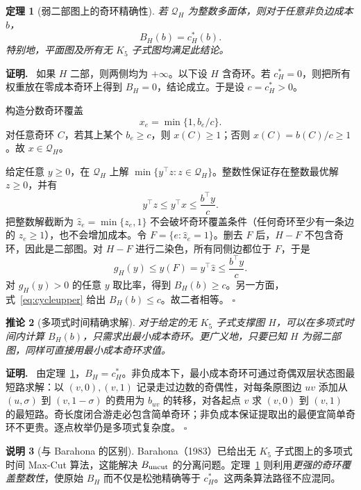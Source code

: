\documentclass[11pt,a4paper]{ctexart}
\newtheorem{theorem}{定理}[section]
\newtheorem{corollary}[theorem]{推论}
\theoremstyle{definition}
\newtheorem{remark}[theorem]{说明}
\newenvironment{proofcn}{\par\noindent\textbf{证明.}\ }{\hfill$\square$\par}
\newcommand{\1}{\boldsymbol 1}
\begin{document}
\begin{theorem}[弱二部图上的奇环精确性]\label{thm:weak}
若 $\mathcal Q_H$ 为整数多面体，则对于任意非负边成本 $b$，
\begin{equation}\label{eq:weakeq}
 \boxed{B_H(b)=c_H^*(b).}
\end{equation}
特别地，平面图及所有无 $K_5$ 子式图均满足此结论。
\end{theorem}
\begin{proofcn}
如果 $H$ 二部，则两侧均为 $+\infty$。以下设 $H$ 含奇环。若 $c_H^*=0$，则把所有权重放在零成本奇环上得到 $B_H=0$，结论成立。于是设 $c=c_H^*>0$。

构造分数奇环覆盖
\[
 x_e=\min\{1,b_e/c\}.
\]
对任意奇环 $C$，若其上某个 $b_e\ge c$，则 $x(C)\ge1$；否则 $x(C)=b(C)/c\ge1$。故 $x\in\mathcal Q_H$。

给定任意 $y\ge0$，在 $\mathcal Q_H$ 上解 $\min\{y^\top z:z\in\mathcal Q_H\}$。整数性保证存在整数最优解 $z\ge0$，并有
\[
 y^\top z\le y^\top x\le\frac{b^\top y}{c}.
\]
把整数解截断为 $\widehat z_e=\min\{z_e,1\}$ 不会破坏奇环覆盖条件（任何奇环至少有一条边的 $z_e\ge1$），也不会增加成本。令 $F=\{e:\widehat z_e=1\}$。删去 $F$ 后，$H-F$ 不包含奇环，因此是二部图。对 $H-F$ 进行二染色，所有同侧边都位于 $F$，于是
\[
 g_H(y)\le y(F)=y^\top\widehat z
 \le\frac{b^\top y}{c}.
\]
对 $g_H(y)>0$ 的任意 $y$ 取比率，得到 $B_H(b)\ge c$。另一方面，式~\eqref{eq:cycleupper} 给出 $B_H(b)\le c$。故二者相等。
\end{proofcn}

\begin{corollary}[多项式时间精确求解]\label{cor:minor}
对于给定的无 $K_5$ 子式支撑图 $H$，可以在多项式时间内计算 $B_H(b)$，只需求出最小成本奇环。更广义地，只要已知 $H$ 为弱二部图，同样可直接用最小成本奇环求值。
\end{corollary}
\begin{proofcn}
由定理~\ref{thm:weak}，$B_H=c_H^*$。非负成本下，最小成本奇环可通过奇偶双层状态图最短路求解：以 $(v,0),(v,1)$ 记录走过边数的奇偶性，对每条原图边 $uv$ 添加从 $(u,\sigma)$ 到 $(v,1-\sigma)$ 的费用为 $b_{uv}$ 的转移，对各起点 $v$ 求 $(v,0)$ 到 $(v,1)$ 的最短路。奇长度闭合游走必包含简单奇环；非负成本保证提取出的最便宜简单奇环不更贵。逐点枚举仍是多项式复杂度。
\end{proofcn}

\begin{remark}[与 Barahona 的区别]
Barahona（1983）已给出无 $K_5$ 子式图上的多项式时间 Max-Cut 算法\cite{Barahona1983}，这能解决 $B_{\rm uncut}$ 的分离问题。定理~\ref{thm:weak} 则利用\emph{更强的奇环覆盖整数性}，使原始 $B_H$ 而不仅是松弛精确等于 $c_H^*$。这两条算法路径不应混同。
\end{remark}
\end{document}

